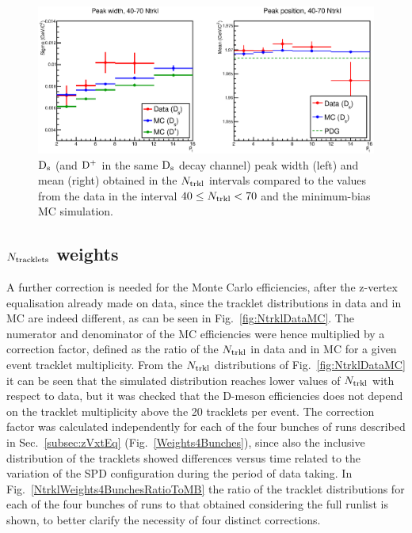 \begin{figure}[htpb]
\centering
 \includegraphics[width=.9\textwidth]{FigCap6/DsMeanSigma_DataMC_4070_Ntrkl.eps}
  \caption{${\rm D_s}$ (and ${\rm D^+}$ in the same ${\rm D_s}$ decay channel) peak width (left) and mean (right) obtained in the $N_{\rm trkl}$ intervals compared to the values from the data in the interval $40 \leq N_{\rm trkl} < 70$ and the minimum-bias MC simulation.}
 \label{fig:DsFitParamsVsNtrkl}
\end{figure}

\subsection {$N_{\rm tracklets}$ weights}
\label{fig:NtrklWeights_vsMult}

A further correction is needed for the Monte Carlo efficiencies, after the z-vertex equalisation already made on data,
since the tracklet distributions in data and in MC are indeed different, as can be seen in Fig.~\ref{fig:NtrklDataMC}.
The numerator and denominator of the MC efficiencies were hence multiplied by a correction factor, 
defined as the ratio of the $N_{\rm trkl}$ in data and in MC for a given event tracklet multiplicity.
From the $N_{\rm trkl}$ distributions of Fig.~\ref{fig:NtrklDataMC} it can be seen that the simulated distribution reaches
lower values of $N_{\rm trkl}$ with respect to data, but it was checked that the D-meson efficiencies does not depend on
the tracklet multiplicity above the 20 tracklets per event.
The correction factor was calculated independently for each of the four bunches of runs described in Sec.~\ref{subsec:zVxtEq} (Fig.~\ref{Weights4Bunches}),
since also the inclusive distribution of the tracklets showed differences versus time related to the variation of the SPD configuration during the
period of data taking. In Fig.~\ref{NtrklWeights4BunchesRatioToMB} the ratio of the tracklet distributions for each of the four bunches
of runs to that obtained considering the full runlist is shown, to better clarify the necessity of four distinct corrections.


